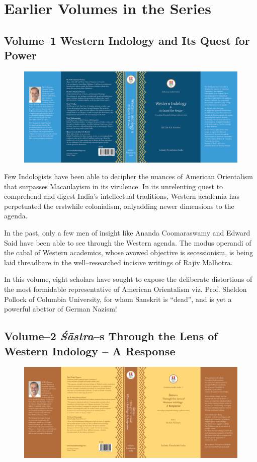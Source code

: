 
\chapter*{Earlier Volumes in the Series}\label{evc}

\section*{Volume–1 Western Indology and Its Quest for Power}

\begin{figure}[!htbp]
\includegraphics[scale=.727]{images/fig01.png}
\end{figure}

Few Indologists have been able to decipher the nuances of American Orientalism that surpasses Macaulayism in its virulence. In its unrelenting quest to comprehend and digest India’s intellectual traditions, Western academia has perpetuated the erstwhile colonialism, only\break adding newer dimensions to the agenda. 

In the past, only a few men of insight like Ananda Coomaraswamy and Edward Said have been able to see through the Western agenda. The modus operandi of the cabal of Western academics, whose avowed objective is secessionism, is being laid threadbare in the well–researched incisive writings of Rajiv Malhotra.

In this volume, eight scholars have sought to expose the deliberate distortions of the most formidable representative of American Orientalism viz. Prof. Sheldon Pollock of Columbia University, for whom Sanskrit is “dead”, and is yet a powerful abettor of German Nazism!


\section*{Volume–2 \textit{Śāstra}–s Through the Lens of Western Indology – A Response}

\begin{figure}[!htbp]
\includegraphics[scale=.727]{images/fig02.png}
\end{figure}

